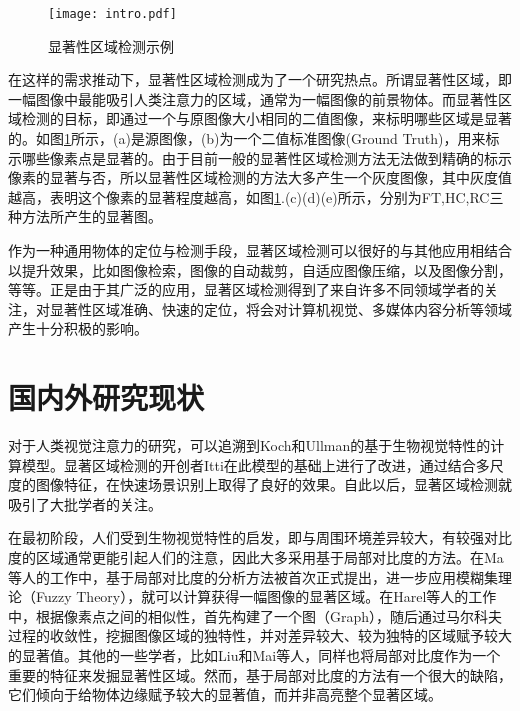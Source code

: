 \begin{figure}[b]
\texttt{[image: intro.pdf]}
\caption{显著性区域检测示例}\label{fig:intro}
\end{figure}

在这样的需求推动下，显著性区域检测成为了一个研究热点。所谓显著性区域，即一幅图像中最能吸引人类注意力的区域，通常为一幅图像的前景物体。而显著性区域检测的目标，即通过一个与原图像大小相同的二值图像，来标明哪些区域是显著的。如图\ref{fig:intro}所示，(a)是源图像，(b)为一个二值标准图像(Ground Truth)，用来标示哪些像素点是显著的。由于目前一般的显著性区域检测方法无法做到精确的标示像素的显著与否，所以显著性区域检测的方法大多产生一个灰度图像，其中灰度值越高，表明这个像素的显著程度越高，如图\ref{fig:intro}.(c)(d)(e)所示，分别为FT\cite{achanta2009frequency},HC\cite{cheng2011global},RC\cite{cheng2011global}三种方法所产生的显著图。

作为一种通用物体的定位与检测手段，显著区域检测可以很好的与其他应用相结合以提升效果，比如图像检索\cite{tsai2012hierarchical}\cite{fang2012effective}，图像的自动裁剪\cite{shechtman2013methods}\cite{deigmoeller2010context}，自适应图像压缩\cite{christopoulos2000jpeg2000}，以及图像分割\cite{jiang2011automatic}\cite{han2006unsupervised}，等等。正是由于其广泛的应用，显著区域检测得到了来自许多不同领域学者的关注，对显著性区域准确、快速的定位，将会对计算机视觉、多媒体内容分析等领域产生十分积极的影响。

\section{国内外研究现状}
对于人类视觉注意力的研究，可以追溯到Koch和Ullman\cite{koch1987shifts}的基于生物视觉特性的计算模型。显著区域检测的开创者Itti\cite{itti1998model}在此模型的基础上进行了改进，通过结合多尺度的图像特征，在快速场景识别上取得了良好的效果。自此以后，显著区域检测就吸引了大批学者的关注。

在最初阶段，人们受到生物视觉特性的启发，即与周围环境差异较大，有较强对比度的区域通常更能引起人们的注意，因此大多采用基于局部对比度的方法。在Ma等人的工作中\cite{ma2003contrast}，基于局部对比度的分析方法被首次正式提出，进一步应用模糊集理论（Fuzzy Theory），就可以计算获得一幅图像的显著区域。在Harel等人的工作中\cite{harel2006graph}，根据像素点之间的相似性，首先构建了一个图（Graph），随后通过马尔科夫过程的收敛性，挖掘图像区域的独特性，并对差异较大、较为独特的区域赋予较大的显著值。其他的一些学者，比如Liu\cite{liu2011learning}和Mai\cite{maisaliency}等人，同样也将局部对比度作为一个重要的特征来发掘显著性区域。然而，基于局部对比度的方法有一个很大的缺陷，它们倾向于给物体边缘赋予较大的显著值，而并非高亮整个显著区域。

